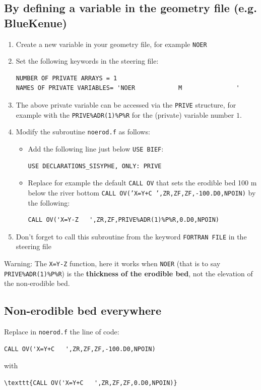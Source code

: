 \subsection{By defining a variable in the geometry file (e.g. BlueKenue)}
\begin{enumerate}
\item Create a new variable in your geometry file, for example \texttt{NOER}
\item Set the following keywords in the \sisyphe steering file:
\begin{lstlisting}[frame=trBL]
NUMBER OF PRIVATE ARRAYS = 1
NAMES OF PRIVATE VARIABLES= 'NOER            M               '
\end{lstlisting}
\item The above private variable can be accessed via the \texttt{PRIVE} structure, for example with the \texttt{PRIVE\%ADR(1)\%P\%R} for the (private) variable number $1$.
\item Modify the subroutine \texttt{noerod.f} as follows:
  \begin{itemize}
    \item Add the following line just below \texttt{USE BIEF}:
      \begin{lstlisting}[frame=trBL]
        USE DECLARATIONS_SISYPHE, ONLY: PRIVE
      \end{lstlisting}
    \item Replace for example the default \texttt{CALL OV} that sets the erodible bed 100 m below the river bottom \texttt{CALL OV('X=Y+C   ',ZR,ZF,ZF,-100.D0,NPOIN)} by the following:
      \begin{lstlisting}[frame=trBL]
       CALL OV('X=Y-Z   ',ZR,ZF,PRIVE%ADR(1)%P%R,0.D0,NPOIN)
      \end{lstlisting}
  \end{itemize}
\item Don't forget to call this subroutine from the keyword \texttt{FORTRAN FILE} in the steering file
\end{enumerate}
  
 \begin{WarningBlock}{Warning:}  
The \texttt{X=Y-Z} function, here it works when \texttt{NOER} (that is to say \texttt{PRIVE\%ADR(1)\%P\%R}) is the \textbf{thickness of the erodible bed}, not the elevation of the non-erodible bed.
 \end{WarningBlock}

 \subsection{Non-erodible bed everywhere}
Replace in \texttt{noerod.f} the line of code:
\begin{lstlisting}[frame=trBL]
  CALL OV('X=Y+C   ',ZR,ZF,ZF,-100.D0,NPOIN)
\end{lstlisting}
with
\begin{lstlisting}[frame=trBL]
\texttt{CALL OV('X=Y+C   ',ZR,ZF,ZF,0.D0,NPOIN)}
\end{lstlisting} 
 
